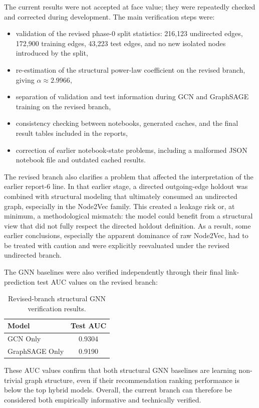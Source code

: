 The current results were not accepted at face value; they were repeatedly
checked and corrected during development. The main verification steps were:
\begin{itemize}
    \item validation of the revised phase-0 split statistics:
    216,123 undirected edges, 172,900 training edges, 43,223 test edges, and
    no new isolated nodes introduced by the split,
    \item re-estimation of the structural power-law coefficient on the revised
    branch, giving $\alpha \approx 2.9966$,
    \item separation of validation and test information during GCN and
    GraphSAGE training on the revised branch,
    \item consistency checking between notebooks, generated caches, and the
    final result tables included in the reports,
    \item correction of earlier notebook-state problems, including a malformed
    JSON notebook file and outdated cached results.
\end{itemize}

The revised branch also clarifies a problem that affected the interpretation of
the earlier report-6 line. In that earlier stage, a directed outgoing-edge
holdout was combined with structural modeling that ultimately consumed an
undirected graph, especially in the Node2Vec family. This created a leakage
risk or, at minimum, a methodological mismatch: the model could benefit from a
structural view that did not fully respect the directed holdout definition. As
a result, some earlier conclusions, especially the apparent dominance of raw
Node2Vec, had to be treated with caution and were explicitly reevaluated under
the revised undirected branch.

The GNN baselines were also verified independently through their final
link-prediction test AUC values on the revised branch:
\begin{table}[H]
\centering
\caption{Revised-branch structural GNN verification results.}
\label{tab:gnn-auc}
\begin{tabular}{lc}
\toprule
\textbf{Model} & \textbf{Test AUC} \\
\midrule
GCN Only & 0.9304 \\
GraphSAGE Only & 0.9190 \\
\bottomrule
\end{tabular}
\end{table}

These AUC values confirm that both structural GNN baselines are learning
non-trivial graph structure, even if their recommendation ranking performance is
below the top hybrid models. Overall, the current branch can therefore be
considered both empirically informative and technically verified.
